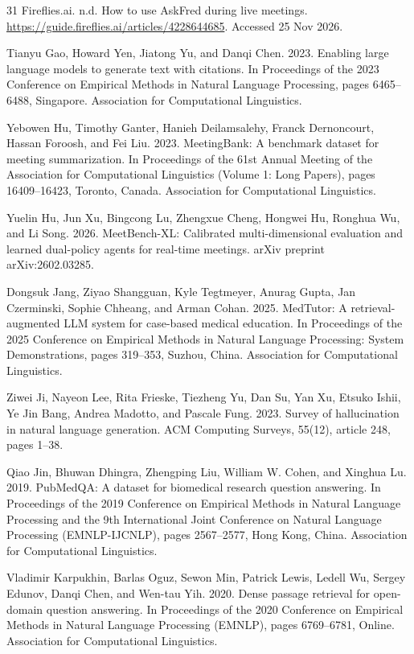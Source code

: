 \documentclass[11pt]{article}
\begin{document}
\begin{thebibliography}{31}
Fireflies.ai. n.d. How to use AskFred during live meetings. \url{https://guide.fireflies.ai/articles/4228644685}. Accessed 25 Nov 2026.

Tianyu Gao, Howard Yen, Jiatong Yu, and Danqi Chen. 2023. Enabling large language models to generate text with citations. In Proceedings of the 2023 Conference on Empirical Methods in Natural Language Processing, pages 6465--6488, Singapore. Association for Computational Linguistics.

Yebowen Hu, Timothy Ganter, Hanieh Deilamsalehy, Franck Dernoncourt, Hassan Foroosh, and Fei Liu. 2023. MeetingBank: A benchmark dataset for meeting summarization. In Proceedings of the 61st Annual Meeting of the Association for Computational Linguistics (Volume 1: Long Papers), pages 16409--16423, Toronto, Canada. Association for Computational Linguistics.

Yuelin Hu, Jun Xu, Bingcong Lu, Zhengxue Cheng, Hongwei Hu, Ronghua Wu, and Li Song. 2026. MeetBench-XL: Calibrated multi-dimensional evaluation and learned dual-policy agents for real-time meetings. arXiv preprint arXiv:2602.03285.

Dongsuk Jang, Ziyao Shangguan, Kyle Tegtmeyer, Anurag Gupta, Jan Czerminski, Sophie Chheang, and Arman Cohan. 2025. MedTutor: A retrieval-augmented LLM system for case-based medical education. In Proceedings of the 2025 Conference on Empirical Methods in Natural Language Processing: System Demonstrations, pages 319--353, Suzhou, China. Association for Computational Linguistics.

Ziwei Ji, Nayeon Lee, Rita Frieske, Tiezheng Yu, Dan Su, Yan Xu, Etsuko Ishii, Ye Jin Bang, Andrea Madotto, and Pascale Fung. 2023. Survey of hallucination in natural language generation. ACM Computing Surveys, 55(12), article 248, pages 1--38.

Qiao Jin, Bhuwan Dhingra, Zhengping Liu, William W. Cohen, and Xinghua Lu. 2019. PubMedQA: A dataset for biomedical research question answering. In Proceedings of the 2019 Conference on Empirical Methods in Natural Language Processing and the 9th International Joint Conference on Natural Language Processing (EMNLP-IJCNLP), pages 2567--2577, Hong Kong, China. Association for Computational Linguistics.

Vladimir Karpukhin, Barlas Oguz, Sewon Min, Patrick Lewis, Ledell Wu, Sergey Edunov, Danqi Chen, and Wen-tau Yih. 2020. Dense passage retrieval for open-domain question answering. In Proceedings of the 2020 Conference on Empirical Methods in Natural Language Processing (EMNLP), pages 6769--6781, Online. Association for Computational Linguistics.


\end{thebibliography}
\end{document}
